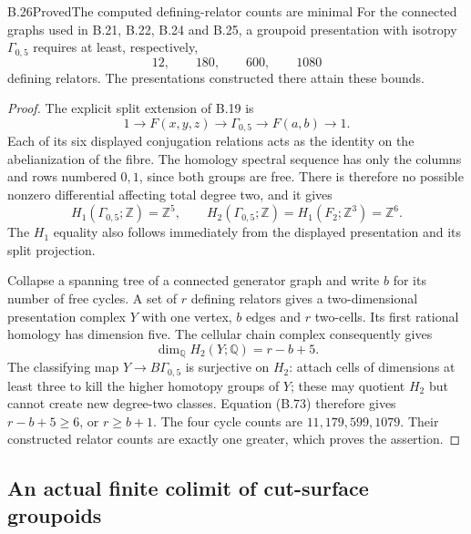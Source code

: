 \begin{result}{B.26}{Proved}{The computed defining-relator counts are minimal}
For the connected graphs used in B.21, B.22, B.24 and
B.25, a groupoid presentation with isotropy
$\Gamma_{0,5}$ requires at least, respectively,
\[
 12,\qquad180,\qquad600,\qquad1080
\]
defining relators.  The presentations constructed there
attain these bounds.
\end{result}
\begin{proof}
The explicit split extension of B.19 is
\[
 1\longrightarrow F(x,y,z)\longrightarrow\Gamma_{0,5}
 \longrightarrow F(a,b)\longrightarrow1.
\]
Each of its six displayed conjugation relations acts
as the identity on the abelianization of the fibre.
The homology spectral sequence has only the columns
and rows numbered $0,1$, since both groups are free.
There is therefore no possible nonzero differential
affecting total degree two, and it gives
\[
 H_1(\Gamma_{0,5};\mathbb Z)=\mathbb Z^5,\qquad
 H_2(\Gamma_{0,5};\mathbb Z)
   =H_1(F_2;\mathbb Z^3)=\mathbb Z^6.              \tag{B.73}
\]
The $H_1$ equality also follows immediately from the
displayed presentation and its split projection.

Collapse a spanning tree of a connected generator graph
and write $b$ for its number of free cycles.  A set of
$r$ defining relators gives a two-dimensional presentation
complex $Y$ with one vertex, $b$ edges and $r$ two-cells.
Its first rational homology has dimension five.  The
cellular chain complex consequently gives
\[
 \dim_{\mathbb Q}H_2(Y;\mathbb Q)=r-b+5.
\]
The classifying map $Y\to B\Gamma_{0,5}$ is surjective
on $H_2$: attach cells of dimensions at least three
to kill the higher homotopy groups of $Y$; these may
quotient $H_2$ but cannot create new degree-two classes.
Equation (B.73) therefore gives $r-b+5\geq6$, or
$r\geq b+1$.  The four cycle counts are $11,179,599,1079$.
Their constructed relator counts are exactly one greater,
which proves the assertion.
\end{proof}


\subsection{An actual finite colimit of cut-surface groupoids}

